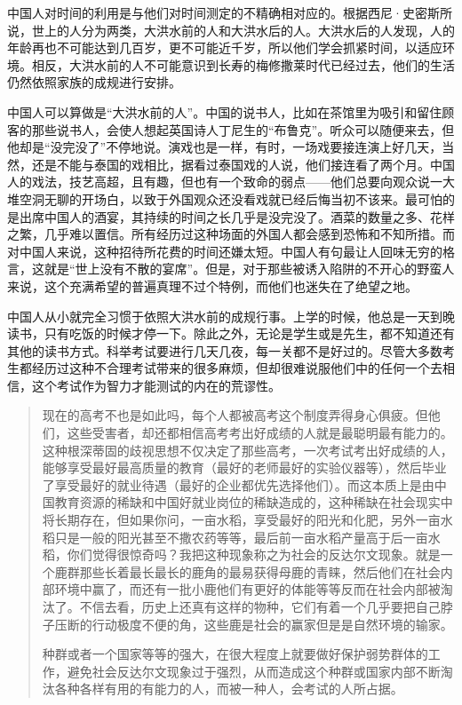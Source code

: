\documentclass[12pt,oneside]{book}
\begin{document}
\begin{common-format}
中国人对时间的利用是与他们对时间测定的不精确相对应的。根据西尼·史密斯所说，世上的人分为两类，大洪水前的人和大洪水后的人。大洪水后的人发现，人的年龄再也不可能达到几百岁，更不可能近千岁，所以他们学会抓紧时间，以适应环境。相反，大洪水前的人不可能意识到长寿的梅修撒莱时代已经过去，他们的生活仍然依照家族的成规进行安排。 

中国人可以算做是“大洪水前的人”。中国的说书人，比如在茶馆里为吸引和留住顾客的那些说书人，会使人想起英国诗人丁尼生的“布鲁克”。听众可以随便来去，但他却是“没完没了”不停地说。演戏也是一样，有时，一场戏要接连演上好几天，当然，还是不能与泰国的戏相比，据看过泰国戏的人说，他们接连看了两个月。中国人的戏法，技艺高超，且有趣，但也有一个致命的弱点——他们总要向观众说一大堆空洞无聊的开场白，以致于外国观众还没看戏就已经后悔当初不该来。最可怕的是出席中国人的酒宴，其持续的时间之长几乎是没完没了。酒菜的数量之多、花样之繁，几乎难以置信。所有经历过这种场面的外国人都会感到恐怖和不知所措。而对中国人来说，这种招待所花费的时间还嫌太短。中国人有句最让人回味无穷的格言，这就是“世上没有不散的宴席”。但是，对于那些被诱入陷阱的不开心的野蛮人来说，这个充满希望的普遍真理不过个特例，而他们也迷失在了绝望之地。

中国人从小就完全习惯于依照大洪水前的成规行事。上学的时候，他总是一天到晚读书，只有吃饭的时候才停一下。除此之外，无论是学生或是先生，都不知道还有其他的读书方式。科举考试要进行几天几夜，每一关都不是好过的。尽管大多数考生都经历过这种不合理考试带来的很多麻烦，但却很难说服他们中的任何一个去相信，这个考试作为智力才能测试的内在的荒谬性。

\begin{quotation}
现在的高考不也是如此吗，每个人都被高考这个制度弄得身心俱疲。但他们，这些受害者，却还都相信高考考出好成绩的人就是最聪明最有能力的。这种根深蒂固的歧视思想不仅决定了那些高考，一次考试考出好成绩的人，能够享受最好最高质量的教育（最好的老师最好的实验仪器等），然后毕业了享受最好的就业待遇（最好的企业都优先选择他们）。而这本质上是由中国教育资源的稀缺和中国好就业岗位的稀缺造成的，这种稀缺在社会现实中将长期存在，但如果你问，一亩水稻，享受最好的阳光和化肥，另外一亩水稻只是一般的阳光甚至不撒农药等等，最后前一亩水稻产量高于后一亩水稻，你们觉得很惊奇吗？我把这种现象称之为社会的反达尔文现象。就是一个鹿群那些长着最长最长的鹿角的最易获得母鹿的青睐，然后他们在社会内部环境中赢了，而还有一批小鹿他们有更好的体能等等反而在社会内部被淘汰了。不信去看，历史上还真有这样的物种，它们有着一个几乎要把自己脖子压断的行动极度不便的角，这些鹿是社会的赢家但是是自然环境的输家。

种群或者一个国家等等的强大，在很大程度上就要做好保护弱势群体的工作，避免社会反达尔文现象过于强烈，从而造成这个种群或国家内部不断淘汰各种各样有用的有能力的人，而被一种人，会考试的人所占据。


\end{quotation}
\end{common-format}
\end{document}
